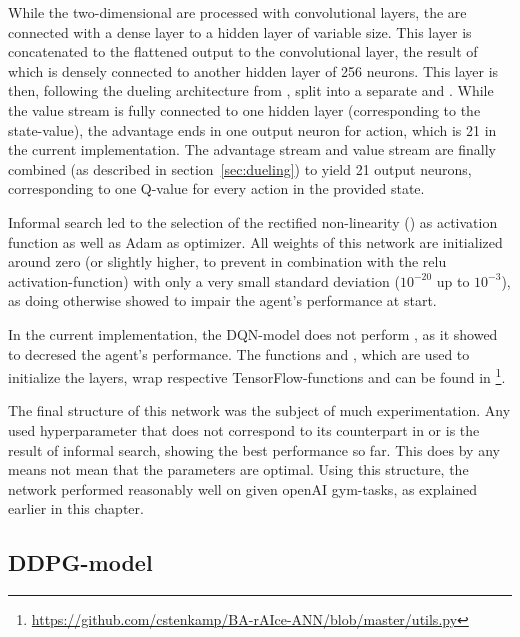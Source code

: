 While the two-dimensional  are processed with convolutional layers, the  are connected with a dense layer to a hidden layer of variable size. This layer is concatenated to the flattened output to the convolutional layer, the result of which is densely connected to another hidden layer of 256 neurons. This layer is then, following the dueling architecture from \cite{wang_dueling_2015}, split into a separate  and . While the value stream is fully connected to one hidden layer (corresponding to the state-value), the advantage ends in one output neuron for action, which is 21 in the current implementation. The advantage stream and value stream are finally combined (as described in section~\ref{sec:dueling}) to yield 21 output neurons, corresponding to one Q-value for every action in the provided state.

Informal search led to the selection of the rectified non-linearity () as activation function as well as Adam\cite{kingma_adam:_2014} as optimizer. All weights of this network are initialized around zero (or slightly higher, to prevent  in combination with the relu activation-function) with only a very small standard deviation ($10^{-20}$ up to $10^{-3}$), as doing otherwise showed to impair the agent's performance at start.

In the current implementation, the DQN-model does not perform \cite{ioffe_batch_2015}, as it showed to decresed the agent's performance. The functions  and , which are used to initialize the layers, wrap respective TensorFlow-functions and can be found in \footnote{\url{https://github.com/cstenkamp/BA-rAIce-ANN/blob/master/utils.py}}.

The final structure of this network was the subject of much experimentation. Any used hyperparameter that does not correspond to its counterpart in \cite{mnih_human-level_2015} or \cite{wang_dueling_2015} is the result of informal search, showing the best performance so far. This does by any means not mean that the parameters are optimal. Using this structure, the network performed reasonably well on given openAI gym-tasks, as explained earlier in this chapter.


\subsection{DDPG-model}

